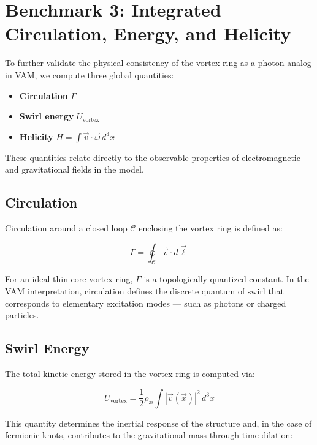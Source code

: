 \section{Benchmark 3: Integrated Circulation, Energy, and Helicity}

To further validate the physical consistency of the vortex ring as a photon analog in VAM, we compute three global quantities:

\begin{itemize}
    \item \textbf{Circulation} $\Gamma$
    \item \textbf{Swirl energy} $U_{\text{vortex}}$
    \item \textbf{Helicity} $H = \int \vec{v} \cdot \vec{\omega} \, d^3x$
\end{itemize}

These quantities relate directly to the observable properties of electromagnetic and gravitational fields in the model.

\subsection{Circulation}

Circulation around a closed loop $\mathcal{C}$ enclosing the vortex ring is defined as:

\begin{equation}
\Gamma = \oint_{\mathcal{C}} \vec{v} \cdot d\vec{\ell}
\end{equation}

For an ideal thin-core vortex ring, $\Gamma$ is a topologically quantized constant. In the VAM interpretation, circulation defines the discrete quantum of swirl that corresponds to elementary excitation modes — such as photons or charged particles.

\subsection{Swirl Energy}

The total kinetic energy stored in the vortex ring is computed via:

\begin{equation}
U_{\text{vortex}} = \frac{1}{2} \rho_{\text{\ae}} \int |\vec{v}(\vec{x})|^2 \, d^3x
\end{equation}

This quantity determines the inertial response of the structure and, in the case of fermionic knots, contributes to the gravitational mass through time dilation:

